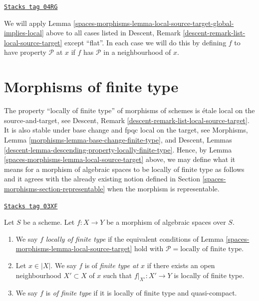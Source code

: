 \begin{remark}
\label{spaces-morphisms-remark-when-apply}
\href{https://stacks.math.columbia.edu/tag/04RG}{\texttt{Stacks tag 04RG}}

We will apply
Lemma \ref{spaces-morphisms-lemma-local-source-target-global-implies-local}
above to all cases listed in
Descent, Remark \ref{descent-remark-list-local-source-target}
except ``flat''. In each case we will do this by defining
$f$ to have property $\mathcal{P}$ at $x$ if $f$ has
$\mathcal{P}$ in a neighbourhood of $x$.
\end{remark}

\section{Morphisms of finite type}
\label{spaces-morphisms-section-finite-type}
The property ``locally of finite type'' of morphisms of schemes
is \'etale local on the source-and-target, see
Descent, Remark \ref{descent-remark-list-local-source-target}.
It is also stable under base change and fpqc local on the target, see
Morphisms, Lemma \ref{morphisms-lemma-base-change-finite-type}, and
Descent, Lemmas \ref{descent-lemma-descending-property-locally-finite-type}.
Hence, by
Lemma \ref{spaces-morphisms-lemma-local-source-target}
above, we may define what it means for a morphism of algebraic spaces
to be locally of finite type as
follows and it agrees with the already existing notion defined in
Section \ref{spaces-morphisms-section-representable}
when the morphism is representable.

\begin{definition}
\label{spaces-morphisms-definition-locally-finite-type}
\href{https://stacks.math.columbia.edu/tag/03XF}{\texttt{Stacks tag 03XF}}

Let $S$ be a scheme.
Let $f : X \to Y$ be a morphism of algebraic spaces over $S$.
\begin{enumerate}
\item We say $f$
{\it locally of finite type} if the equivalent conditions of
Lemma \ref{spaces-morphisms-lemma-local-source-target}
hold with
$\mathcal{P} = \text{locally of finite type}$.
\item Let $x \in |X|$. We say $f$ is of {\it finite type at $x$}
if there exists an open neighbourhood $X' \subset X$ of $x$ such
that $f|_{X'} : X' \to Y$ is locally of finite type.
\item We say $f$ is
{\it of finite type} if it is locally of finite type and quasi-compact.
\end{enumerate}
\end{definition}

